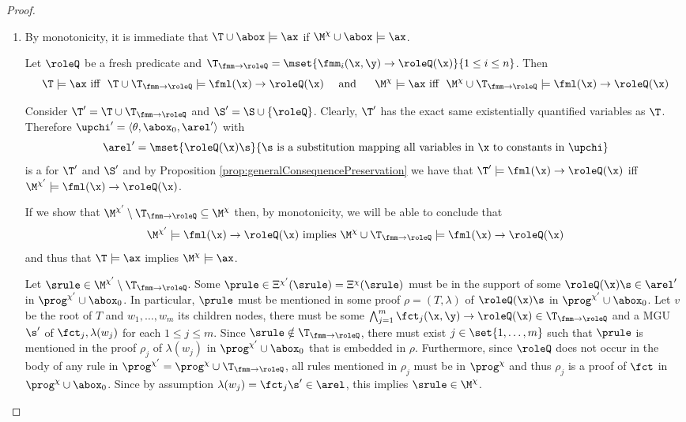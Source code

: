\begin{proof}\
\begin{enumerate}
\item By monotonicity, it is immediate that $\T\cup\abox\models \ax$ if $\M^{\chi}\cup\abox\models \ax$.

Let $\roleQ$ be a fresh predicate and $\T_{\fmm\to\roleQ} = \mset{\fmm_i(\x,\y) \to \roleQ(\x)}{1\leq i \leq n}$.
Then 
\[\T\models \ax \text{\  iff \ } 
\T\cup \T_{\fmm\to\roleQ} \models \fml(\x)\to\roleQ(\x)
\text{\ \ \ \ and \ \ \ \ }
\M^{\chi}\models \ax \text{\  iff \ } 
\M^{\chi}\cup\T_{\fmm\to\roleQ}\models \fml(\x)\to\roleQ(\x)\]

Consider $\T' = \T\cup\T_{\fmm\to\roleQ} $ and $\S' = \S\cup\{\roleQ\}$.
Clearly, $\T'$ has the exact same existentially quantified variables as $\T$. Therefore
$\upchi' = \langle \theta, \abox_0, \arel'\rangle$ with 
\[\arel' = \mset{\roleQ(\x)\s}{\s \text{ is a substitution mapping all variables in } \x \text{ to constants in }\upchi}\]
is a \bla{} for $\T'$ and $\S'$
and by Proposition \ref{prop:generalConsequencePreservation} we have that $\T'\models \fml(\x)\to\roleQ(\x)$ iff
$\M^{\chi'}\models \fml(\x)\to\roleQ(\x)$. 

If we show that $\M^{\chi'}\setminus\T_{\fmm\to\roleQ}  \subseteq \M^{\chi}$
then, by monotonicity, we will be able to conclude that 
\[\M^{\chi'}\models \fml(\x)\to\roleQ(\x) \text{ implies }
\M^{\chi}\cup\T_{\fmm\to\roleQ} \models \fml(\x)\to\roleQ(\x)\]
and thus that $\T\models \ax$ implies $\M^{\chi}\models \ax$.

Let $\srule\in \M^{\chi'}\setminus\T_{\fmm\to\roleQ} $.
Some $\prule\in\Xi^{\chi'}(\srule) = \Xi^{\chi}(\srule)$
must be in the support of some $\roleQ(\x)\s\in\arel'$ in $\prog^{\chi'}\cup\abox_0$.
In particular, $\prule$ must be mentioned in some proof $\rho = (T,\lambda)$ of $\roleQ(\x)\s$ 
in $\prog^{\chi'}\cup\abox_0$.
Let $v$ be the root of $T$ and $w_1,\dots,w_m$ its children nodes, there must be some 
$\bigwedge_{j=1}^m\fct_j(\x,\y)\to \roleQ(\x)\in\T_{\fmm\to\roleQ} $ 
and a MGU $\s'$ of $\fct_j, \lambda(w_j)$ for each $1\leq j \leq m$.
Since $\srule\notin \T_{\fmm\to\roleQ}$, 
there must exist $j\in\set{1,\dots,m}$ such that $\prule$ is mentioned in the proof $\rho_j$ 
of $\lambda(w_j)$ in $\prog^{\chi'}\cup\abox_0$ that is embedded in $\rho$.
Furthermore, since $\roleQ$ does not occur in the body of any rule in 
$\prog^{\chi'} = \prog^{\chi}\cup\T_{\fmm\to\roleQ}$, all rules 
mentioned in $\rho_j$ must be in $\prog^{\chi}$ and thus $\rho_j$ is a proof of $\fct$ in
$\prog^{\chi}\cup\abox_0$. Since by assumption $\lambda(w_j) = \fct_j\s'\in\arel$, this 
implies $\srule\in\M^{\chi}$.


\end{enumerate}
\end{proof}
